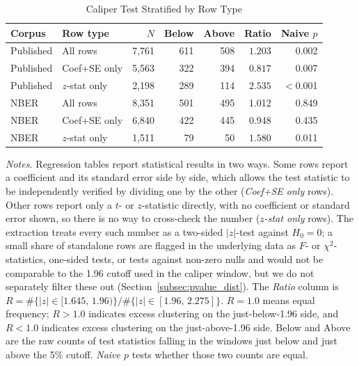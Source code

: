 \documentclass[12pt]{article}
\begin{document}
\begin{table}[ht]
\centering
\caption{Caliper Test Stratified by Row Type}
\label{tab:coefse_caliper}
\begin{singlespace}
\small
\begin{tabular}{llrrrrr}
\hline\hline
Corpus & Row type & $N$ & Below & Above & Ratio & Naive $p$ \\
\hline
Published & All rows         & 7,761 & 611 & 508 & $1.203$\rlap{$^{***\uparrow}$} & 0.002 \\
Published & Coef+SE only     & 5,563 & 322 & 394 & $0.817$\rlap{$^{***\downarrow}$} & 0.007 \\
Published & $z$-stat only    & 2,198 & 289 & 114 & $2.535$\rlap{$^{***\uparrow}$} & $<$0.001 \\[4pt]
NBER      & All rows         & 8,351 & 501 & 495 & 1.012                  & 0.849 \\
NBER      & Coef+SE only     & 6,840 & 422 & 445 & 0.948                  & 0.435 \\
NBER      & $z$-stat only    & 1,511 &  79 &  50 & $1.580$\rlap{$^{**\uparrow}$}  & 0.011 \\
\hline\hline
\end{tabular}
\begin{minipage}{\textwidth}
\smallskip
\footnotesize
\textit{Notes.}  Regression tables report statistical results in two ways.
Some rows report a coefficient and its standard error side by side, which
allows the test statistic to be independently verified by dividing one by
the other (\textit{Coef+SE only} rows).
Other rows report only a $t$- or $z$-statistic directly, with no
coefficient or standard error shown, so there is no way to cross-check
the number (\textit{$z$-stat only} rows).  The extraction treats every
such number as a two-sided $|z|$-test against $H_0 = 0$; a small share
of standalone rows are flagged in the underlying data as $F$- or
$\chi^2$-statistics, one-sided tests, or tests against non-zero nulls
and would not be comparable to the 1.96 cutoff used in the caliper
window, but we do not separately filter these out
(Section~\ref{subsec:pvalue_dist}).
The \textit{Ratio} column is
$R = \#\{|z|\in[1.645,\,1.96)\}/\#\{|z|\in[1.96,\,2.275]\}$.
$R = 1.0$ means equal frequency; $R > 1.0$ indicates excess clustering on
the just-below-1.96 side, and $R < 1.0$ indicates excess clustering on the
just-above-1.96 side.
Below and Above are the raw counts of test statistics
falling in the windows just below and just above the 5\% cutoff.
\textit{Naive $p$} tests whether those two counts are equal.

\end{minipage}
\end{singlespace}
\end{table}
\end{document}
